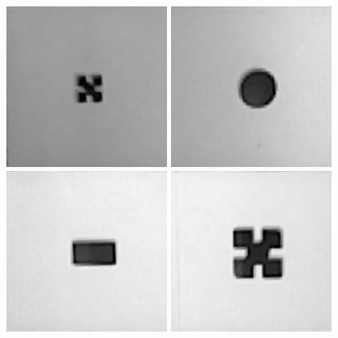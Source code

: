 \documentclass{article}
\begin{document}
\begin{figure}[h!]
\begin{minipage}{\textwidth}
\centering
\includegraphics[scale=0.3]{images/tile0.jpg}
\hspace{0.1cm}
\includegraphics[scale=0.3]{images/tile1.jpg}
\hspace{0.1cm}
\includegraphics[scale=0.3]{images/tile2.jpg}
\hspace{0.1cm}
\includegraphics[scale=0.3]{images/tile3.jpg}

\end{minipage}
\end{figure}
\end{document}
